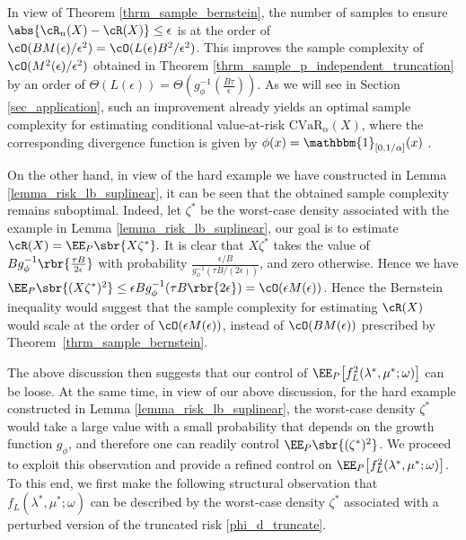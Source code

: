 \documentclass[9pt]{article} %
\numberwithin{equation}{section}
\renewcommand{\frac}[2]{\tfrac{#1}{#2}}
\begin{document}
\begin{remark}
In view of Theorem \ref{thrm_sample_bernstein}, the number of samples to ensure $\abs{\cR_n(X) - \cR(X)} \leq \epsilon$ is at the order of 
$\cO( B M(\epsilon)  /\epsilon^2) = \cO( L(\epsilon) B^2  /\epsilon^2)$.
This improves the sample complexity of $\cO(  M^2(\epsilon)  /\epsilon^2)$ obtained in Theorem \ref{thrm_sample_p_independent_truncation}  by an order of $\Theta( L(\epsilon) ) = \Theta (g_\phi^{-1}(\frac{B\tau}{\epsilon}))$. 
As we will see in Section \ref{sec_application}, such an improvement already yields an optimal sample complexity for estimating conditional value-at-risk $\mathrm{CVaR}_\alpha(X)$,
where the corresponding divergence function is given by $\phi(x) = \mathbbm{1}_{[0, 1/\alpha]}(x)$  \cite{shapiro2017distributionally}. 


On the other hand, in view of the hard example we have constructed in Lemma \ref{lemma_risk_lb_suplinear}, it can be seen that the obtained sample complexity remains suboptimal. 
Indeed, let $\zeta^*$ be the worst-case density associated with the example in Lemma \ref{lemma_risk_lb_suplinear}, our goal is to estimate 
$
\cR(X) = \EE_P \sbr{ X \zeta^*}.
$
It is clear that $X \zeta^*$ takes the value of $B g_\phi^{-1}\rbr{\frac{\tau B}{2\epsilon}}$ with probability $\frac{\epsilon / B}{g_\phi^{-1}( \tau B / (2\epsilon))}$, and zero otherwise. 
Hence we have 
$\EE_P \sbr{(X \zeta^*)^2} \leq  \epsilon B g_\phi^{-1}({\tau B}\rbr{2\epsilon})  = \cO(\epsilon M(\epsilon))$. 
Hence the Bernstein inequality would suggest that the sample complexity for estimating 
$\cR(X)$
would scale at the order of $ \cO(\epsilon M(\epsilon))$, instead of $\cO( B M(\epsilon))$ prescribed by Theorem~\ref{thrm_sample_bernstein}.
\end{remark}

The above discussion then suggests that our control of $\EE_P \big[{f_{L}^2 (\lambda^*,\mu^*; \omega)}\big]$ can be loose. 
At the same time, in view of our above discussion, for the hard example constructed in Lemma \ref{lemma_risk_lb_suplinear}, the worst-case density $\zeta^*$ would take a large value with a small probability that depends on the growth function $g_\phi$, and therefore one can readily control 
$\EE_P \sbr{(\zeta^*)^2}$.
We proceed to exploit this observation and provide a refined control on $\EE_P \big[{f_{L}^2 (\lambda^*,\mu^*; \omega)}\big]$.
To this end, we first make the following structural observation that $f_L(\lambda^*, \mu^*; \omega)$ can be described by the worst-case density $\zeta^*$ associated with a perturbed version of the truncated risk \eqref{phi_d_truncate}.
\end{document}
